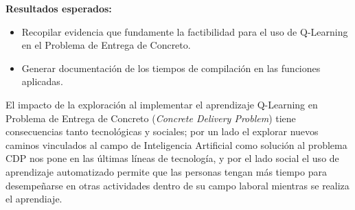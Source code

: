 \documentclass[10pt]{article}
\begin{document}
\textbf{Resultados esperados:}
\begin{itemize}
  \item Recopilar evidencia que fundamente la factibilidad para el uso de Q-Learning en el Problema de Entrega de Concreto.
  \item Generar documentación de los tiempos de compilación en las funciones aplicadas.
\end{itemize}

El impacto de la exploración al implementar el aprendizaje Q-Learning en Problema de Entrega de Concreto (\textit{Concrete Delivery Problem}) tiene consecuencias tanto tecnológicas y sociales; por un lado el explorar nuevos caminos vinculados al campo de Inteligencia Artificial como solución al problema CDP nos pone en las últimas líneas de tecnología, y por el lado social el uso de aprendizaje automatizado permite que las personas tengan más tiempo para desempeñarse en otras actividades dentro de su campo laboral mientras se realiza el aprendiaje.
%
%



%
%
%
%
%
\end{document}

